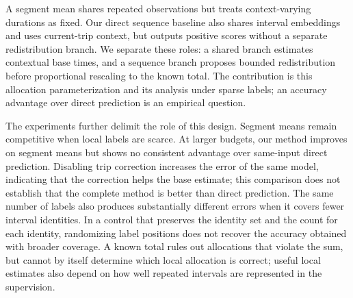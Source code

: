 A segment mean shares repeated observations but treats context-varying durations as fixed. Our direct sequence baseline also shares interval embeddings and uses current-trip context, but outputs positive scores without a separate redistribution branch. We separate these roles: a shared branch estimates contextual base times, and a sequence branch proposes bounded redistribution before proportional rescaling to the known total. The contribution is this allocation parameterization and its analysis under sparse labels; an accuracy advantage over direct prediction is an empirical question.

The experiments further delimit the role of this design. Segment means remain competitive when local labels are scarce. At larger budgets, our method improves on segment means but shows no consistent advantage over same-input direct prediction. Disabling trip correction increases the error of the same model, indicating that the correction helps the base estimate; this comparison does not establish that the complete method is better than direct prediction. The same number of labels also produces substantially different errors when it covers fewer interval identities. In a control that preserves the identity set and the count for each identity, randomizing label positions does not recover the accuracy obtained with broader coverage. A known total rules out allocations that violate the sum, but cannot by itself determine which local allocation is correct; useful local estimates also depend on how well repeated intervals are represented in the supervision.
